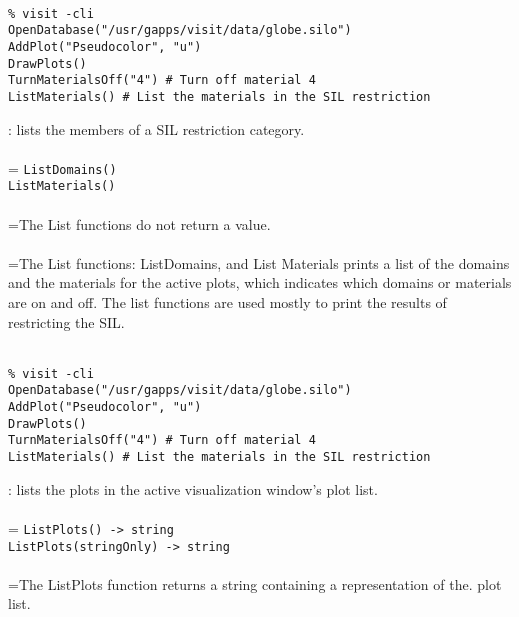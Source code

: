 \documentclass[10pt,a4paper]{report}
\begin{document}
\\[-6mm]
\begin{verbatim}% visit -cli
OpenDatabase("/usr/gapps/visit/data/globe.silo")
AddPlot("Pseudocolor", "u")
DrawPlots()
TurnMaterialsOff("4") # Turn off material 4
ListMaterials() # List the materials in the SIL restriction 
\end{verbatim}
\newpage


{}
: lists the members of a SIL restriction category.\\[-3mm]

 \\ 
\hangindent=\parindent 
\verb!ListDomains()!\\ 
\verb!ListMaterials()!\\ [-3mm]

 \\ 
\hangindent=\parindent The List functions do not return a value. \\[-3mm] 

 \\ 
\hangindent=\parindent The List functions: ListDomains, and List Materials prints a list of the domains and the materials for the active plots, which indicates which domains or materials are on and off. The list functions are used mostly to print the results of restricting the SIL. \\[-3mm] 

\\[-6mm]
\begin{verbatim}% visit -cli
OpenDatabase("/usr/gapps/visit/data/globe.silo")
AddPlot("Pseudocolor", "u")
DrawPlots()
TurnMaterialsOff("4") # Turn off material 4
ListMaterials() # List the materials in the SIL restriction 
\end{verbatim}
\newpage


{}
: lists the plots in the active visualization window's plot list.\\[-3mm]

 \\ 
\hangindent=\parindent 
\verb!ListPlots() -> string!\\ 
\verb!ListPlots(stringOnly) -> string!\\ [-3mm]

 \\ 
\hangindent=\parindent The ListPlots function returns a string containing a representation of the. plot list. \\[-3mm] 
\end{document}
